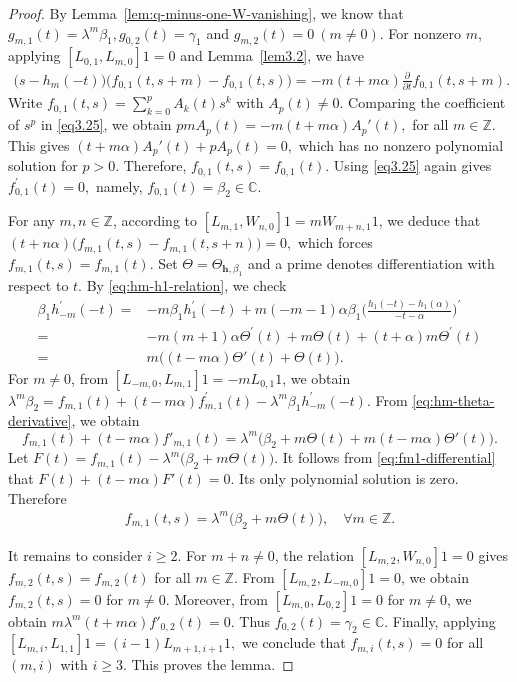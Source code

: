 \documentclass[a4paper]{amsart}
\numberwithin{equation}{section}
\begin{document}
\begin{proof}
By Lemma~\ref{lem:q-minus-one-W-vanishing}, we know that
$
g_{m,1}(t)=\lambda^m\beta_1, 
g_{0,2}(t)=\gamma_1$  and $ 
g_{m,2}(t)=0 \ (m\neq0)$.
For nonzero $m$, applying $[L_{0,1},L_{m,0}]1=0$ and Lemma~\ref{lem3.2}, 
  we have 
  \begin{align}\label{eq3.25}
      \big(s-h_m(-t)\big)\big(f_{0,1}(t,s+m)-f_{0,1}(t,s)\big)=-m(t+m\alpha)\frac{\partial}{\partial t}f_{0,1}(t,s+m).
  \end{align}
Write
  $
  f_{0,1}(t,s)=\sum_{k=0}^pA_k(t)s^k
  $
  with $A_p(t)\neq0$. 
  Comparing the coefficient of $s^p$ in \eqref{eq3.25}, we obtain
$
  pmA_p(t)=-m(t+m\alpha)A_p'(t),
$
for all $m\in\mathbb{Z}$. This gives
  $
  (t+m\alpha)A_p'(t)+pA_p(t)=0,
 $
  which has no nonzero polynomial solution for $p>0$. Therefore,
$
f_{0,1}(t,s)=f_{0,1}(t).
$
Using \eqref{eq3.25} again gives
$
f^\prime_{0,1}(t)=0,
$
namely,
$f_{0,1}(t)=\beta_2\in\mathbb C.$


 


For any  $m,n\in\mathbb{Z}$, according to 
$[L_{m,1},W_{n,0}]1=mW_{m+n,1}1$, 
we deduce that 
$(t+n\alpha)\big(f_{m,1}(t,s)-f_{m,1}(t,s+n)\big)=0,$ which forces $f_{m,1}(t,s)=f_{m,1}(t)$.
 Set $\Theta=\Theta_{\mathbf h,\beta_1}$ and a prime denotes differentiation with respect to $t$. By   \eqref{eq:hm-h1-relation}, we check 
\begin{align}\label{eq:hm-theta-derivative}
\beta_1h^\prime_{-m}(-t)
 =&-m\beta_1h^\prime_1(-t)+m(-m-1)\alpha\beta_1\Big(\frac{h_1(-t)-h_1(\alpha)}{-t-\alpha}\Big)^\prime 
 \\=&\nonumber -m(m+1)\alpha\Theta^\prime(t)+m\Theta(t)+(t+\alpha)m\Theta^\prime(t)
\\=&m\bigl((t-m\alpha)\Theta'(t)+\Theta(t)\bigr).\nonumber
\end{align} 
For $m\neq0$, from
$[L_{-m,0},L_{m,1}]1=-mL_{0,1}1$, we obtain 
$
\lambda^{m}\beta_2
=f_{m,1}(t)+(t-m\alpha)f^\prime_{m,1}(t)-\lambda^{m}\beta_1 h^\prime_{-m}(-t).$
From  \eqref{eq:hm-theta-derivative}, we obtain 
\begin{equation}\label{eq:fm1-differential}
f_{m,1}(t)+(t-m\alpha)f'_{m,1}(t)
=\lambda^m\bigl(\beta_2+m\Theta(t)+m(t-m\alpha)\Theta'(t)\bigr).
\end{equation}
Let
$
F(t)=f_{m,1}(t)-\lambda^m\bigl(\beta_2+m\Theta(t)\bigr).
$
It follows from  \eqref{eq:fm1-differential} that 
$F(t)+(t-m\alpha)F'(t)=0$. Its only polynomial solution is zero. Therefore
\begin{align*}
f_{m,1}(t,s)
    =\lambda^m\bigl(\beta_2+m\Theta(t)\bigr),\quad \forall m\in\mathbb{Z}.
\end{align*}

It remains to consider $i\ge2$. For $m+n\neq0$, the relation $[L_{m,2},W_{n,0}]1=0$ gives $f_{m,2}(t,s)=f_{m,2}(t)$ for all $m\in\mathbb{Z}$. From
$[L_{m,2},L_{-m,0}]1=0$,
we obtain
$ 
f_{m,2}(t,s)=0$
for  $m\neq0$.
Moreover, from $[L_{m,0},L_{0,2}]1=0$ for
$m\neq0$, we obtain
$
m\lambda^m(t+m\alpha)f'_{0,2}(t)=0.
$
Thus $f_{0,2}(t)=\gamma_2\in\mathbb C$.
Finally, applying
$
[L_{m,i},L_{1,1}]1
= 
(i-1)L_{m+1,i+1}1,
$
we conclude that
$f_{m,i}(t,s)=0$
for all $(m,i)$ with $i\ge3$. This proves the lemma.
\end{proof}
\end{document}
